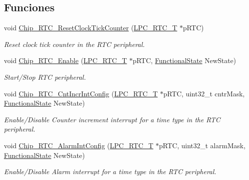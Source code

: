 \subsection*{Funciones}
\begin{DoxyCompactItemize}
\item 
void \hyperlink{group___r_t_c__18_x_x__43_x_x_ga1d569e8d5d570f6c79d2d1f803bb5f7c}{Chip\+\_\+\+R\+T\+C\+\_\+\+Reset\+Clock\+Tick\+Counter} (\hyperlink{struct_l_p_c___r_t_c___t}{L\+P\+C\+\_\+\+R\+T\+C\+\_\+T} $\ast$p\+R\+TC)
\begin{DoxyCompactList}\small\item\em Reset clock tick counter in the R\+TC peripheral. \end{DoxyCompactList}\item 
void \hyperlink{group___r_t_c__18_x_x__43_x_x_gaad05032c6d6c4bc5ea9e02311cdc9a18}{Chip\+\_\+\+R\+T\+C\+\_\+\+Enable} (\hyperlink{struct_l_p_c___r_t_c___t}{L\+P\+C\+\_\+\+R\+T\+C\+\_\+T} $\ast$p\+R\+TC, \hyperlink{group___l_p_c___types___public___types_gac9a7e9a35d2513ec15c3b537aaa4fba1}{Functional\+State} New\+State)
\begin{DoxyCompactList}\small\item\em Start/\+Stop R\+TC peripheral. \end{DoxyCompactList}\item 
void \hyperlink{group___r_t_c__18_x_x__43_x_x_gaddaf7559a23df0704358128234fcb214}{Chip\+\_\+\+R\+T\+C\+\_\+\+Cnt\+Incr\+Int\+Config} (\hyperlink{struct_l_p_c___r_t_c___t}{L\+P\+C\+\_\+\+R\+T\+C\+\_\+T} $\ast$p\+R\+TC, uint32\+\_\+t cntr\+Mask, \hyperlink{group___l_p_c___types___public___types_gac9a7e9a35d2513ec15c3b537aaa4fba1}{Functional\+State} New\+State)
\begin{DoxyCompactList}\small\item\em Enable/\+Disable Counter increment interrupt for a time type in the R\+TC peripheral. \end{DoxyCompactList}\item 
void \hyperlink{group___r_t_c__18_x_x__43_x_x_ga2ecd6a555d1a1977a80a30ca21645ca4}{Chip\+\_\+\+R\+T\+C\+\_\+\+Alarm\+Int\+Config} (\hyperlink{struct_l_p_c___r_t_c___t}{L\+P\+C\+\_\+\+R\+T\+C\+\_\+T} $\ast$p\+R\+TC, uint32\+\_\+t alarm\+Mask, \hyperlink{group___l_p_c___types___public___types_gac9a7e9a35d2513ec15c3b537aaa4fba1}{Functional\+State} New\+State)
\begin{DoxyCompactList}\small\item\em Enable/\+Disable Alarm interrupt for a time type in the R\+TC peripheral. \end{DoxyCompactList}\item 

\end{DoxyCompactItemize}

